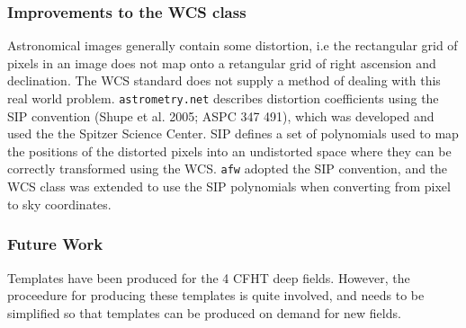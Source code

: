 %

\subsubsection{Improvements to the WCS class}
Astronomical images generally contain some distortion, i.e the rectangular grid of pixels in an image does not map onto a retangular grid of right ascension and declination. The WCS standard does not supply a method of dealing with this real world problem. {\tt astrometry.net} describes distortion coefficients using the SIP convention (Shupe et al. 2005; ASPC 347 491), which was developed and used the the Spitzer Science Center. SIP defines a set of polynomials used to map the positions of the distorted pixels into an undistorted space where they can be correctly transformed using the WCS. {\tt afw} adopted the SIP convention, and the WCS class was extended to use the SIP polynomials when converting from pixel to sky coordinates.


\subsubsection{Future Work}
Templates have been produced for the 4 CFHT deep fields. However, the proceedure for producing these templates is quite involved, and needs to be simplified so that templates can be produced on demand for new fields.
